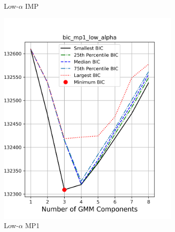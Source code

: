 \documentclass[a4paper,12pt]{article}
\begin{document}
\begin{figure}[htbp]
\begin{subfigure}[t]{0.24\textwidth}
        \caption{Low-$\alpha$ IMP}
    \end{subfigure}
    \begin{subfigure}[t]{0.24\textwidth}
        \includegraphics[width=\textwidth]{../figures/bic_mp1_low_alpha.png}
        \caption{Low-$\alpha$ MP1}
    \end{subfigure}
    \begin{subfigure}[t]{0.24\textwidth}

\end{subfigure}
\end{figure}
\end{document}
